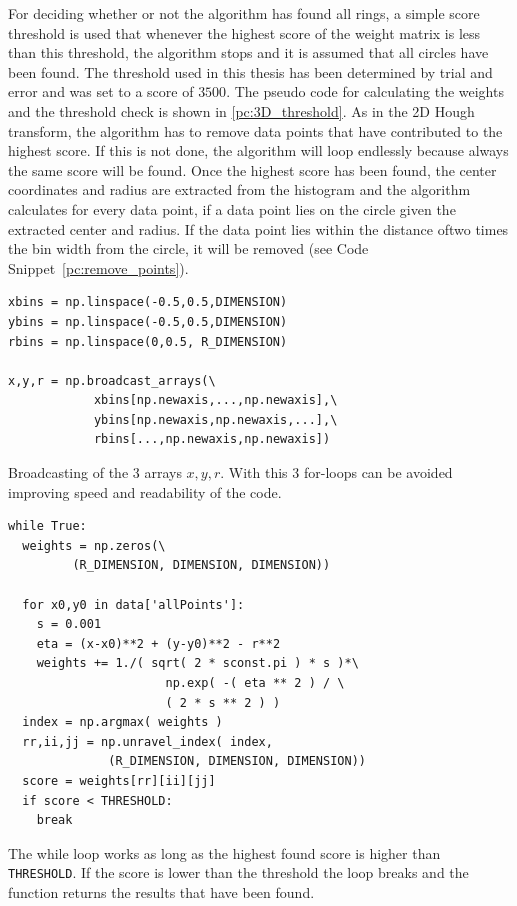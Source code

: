 \documentclass[11pt]{scrreprt}
\begin{document}
For deciding whether or not the algorithm has found all rings, a simple score threshold is used that whenever the highest score
of the weight matrix is less than this threshold, the algorithm stops and it is assumed that all circles have been found. The threshold
used in this thesis has been determined by trial and error and was set to a score of $3500$. The pseudo code for calculating the weights 
and the threshold check is shown in \ref{pc:3D_threshold}. As in the 2D Hough transform, the algorithm has to remove data 
points that have contributed to the highest score. If this is not done, the algorithm will loop endlessly because always the same score will be 
found. Once the highest score has been found, the center coordinates and radius are extracted from the histogram and the 
algorithm calculates for every data point, if a data point lies on the circle given the extracted center and radius. If the data point 
lies within the distance oftwo times the bin width from the circle, it will be removed (see Code Snippet~\ref{pc:remove_points}).

\begin{codesnippet}[htbp]
  \begin{lstlisting}
xbins = np.linspace(-0.5,0.5,DIMENSION)
ybins = np.linspace(-0.5,0.5,DIMENSION)
rbins = np.linspace(0,0.5, R_DIMENSION)

x,y,r = np.broadcast_arrays(\
            xbins[np.newaxis,...,np.newaxis],\
            ybins[np.newaxis,np.newaxis,...],\
            rbins[...,np.newaxis,np.newaxis])
\end{lstlisting}
\caption[3D broadcasting]{Broadcasting of the 3 arrays $x,y,r$. With this 3 for-loops can be avoided improving speed and readability
of the code.}
\label{pc:3D_broadcasting}
\end{codesnippet}

\begin{codesnippet}[htbp]
  \begin{lstlisting}
while True:
  weights = np.zeros(\
         (R_DIMENSION, DIMENSION, DIMENSION))

  for x0,y0 in data['allPoints']:
    s = 0.001
    eta = (x-x0)**2 + (y-y0)**2 - r**2
    weights += 1./( sqrt( 2 * sconst.pi ) * s )*\
                      np.exp( -( eta ** 2 ) / \
                      ( 2 * s ** 2 ) )
  index = np.argmax( weights )
  rr,ii,jj = np.unravel_index( index, 
              (R_DIMENSION, DIMENSION, DIMENSION))
  score = weights[rr][ii][jj]
  if score < THRESHOLD:
    break  
\end{lstlisting}
\caption[Calculation of weights and threshold check for 3D HT]{The while loop works as long as the highest found score is higher than
\texttt{THRESHOLD}. If the score is lower than the threshold the loop breaks and the function returns the results that have been found.}
\label{pc:3D_threshold}
\end{codesnippet}
\end{document}
